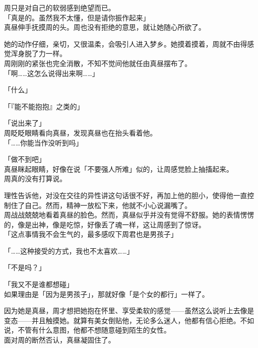 周只是对自己的软弱感到绝望而已。\\

「真是的。虽然我不太懂，但是请你振作起来」\\

真昼伸手抚摸周的头。周也没有拒绝的意思，就让她随心所欲了。

她的动作仔细，亲切，又很温柔，会吸引人进入梦乡。她摸着摸着，周就不由得感觉浑身脱了力一样。\\

周刚刚的紧张也完全消散，不知不觉间他就任由真昼摆布了。\\

「啊……这怎么说得出来啊……」

「什么」

「『能不能抱抱』之类的」

「说出来了」\\

周眨眨眼睛看向真昼，发现真昼也在抬头看着他。\\

「……你能当作没听到吗」

「做不到吧」\\

真昼眯起眼睛，好像在说「不要强人所难」似的，让周感觉脸上抽搐起来。\\

周真的没有打算说。

理性告诉他，对没在交往的异性讲这句话很不好，再加上他的胆小，使得他一直控制住了自己。然而，精神一放松下来，他就不小心说漏嘴了。\\

周战战兢兢地看着真昼的脸色。然而，真昼似乎并没有觉得不舒服。她的表情愣愣的，像是出神，像是吃惊，好像丢了魂一样，这让周感到了惊讶。\\

「这点事情我不会生气的，最多感叹下周君也是男孩子」

「……这种接受的方式，我也不太喜欢……」

「不是吗？」

「我又不是谁都想碰」\\

如果理由是「因为是男孩子」，那就好像「是个女的都行」一样了。

因为她是真昼，周才想把她抱在怀里、享受柔软的感觉——虽然这么说听上去像是变态——并且触摸她。就算有美女倒贴他，无论多么迷人，他都有信心拒绝。不如说，不管有什么意图，他都不想随意碰到陌生的女性。\\

面对周的断然否认，真昼凝固住了。

